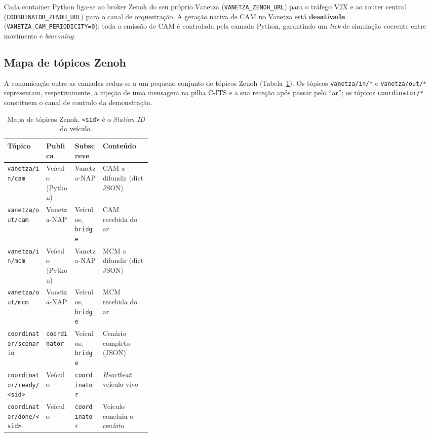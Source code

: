 \documentclass[11pt,a4paper]{article}
\begin{document}
Cada container Python liga-se ao broker Zenoh do seu próprio Vanetza
(\texttt{VANETZA\_ZENOH\_URL}) para o tráfego V2X e ao router central
(\texttt{COORDINATOR\_ZENOH\_URL}) para o canal de orquestração. A geração nativa de
CAM no Vanetza está \textbf{desativada} (\texttt{VANETZA\_CAM\_PERIODICITY=0}): toda a
emissão de CAM é controlada pela camada Python, garantindo um \emph{tick} de simulação
coerente entre movimento e \emph{beaconing}.

\subsection{Mapa de tópicos Zenoh}

A comunicação entre as camadas reduz-se a um pequeno conjunto de tópicos Zenoh
(Tabela~\ref{tab:topicos}). Os tópicos \texttt{vanetza/in/*} e \texttt{vanetza/out/*}
representam, respetivamente, a injeção de uma mensagem na pilha C-ITS e a sua receção
após passar pelo ``ar''; os tópicos \texttt{coordinator/*} constituem o canal de
controlo da demonstração.

\begin{table}[H]
  \centering
  \small
  \renewcommand{\arraystretch}{1.2}
  \begin{tabular}{@{}lllp{0.34\linewidth}@{}}
    \toprule
    \textbf{Tópico} & \textbf{Publica} & \textbf{Subscreve} & \textbf{Conteúdo} \\
    \midrule
    \texttt{vanetza/in/cam}  & Veículo (Python) & Vanetza-NAP & CAM a difundir (dict JSON) \\
    \texttt{vanetza/out/cam} & Vanetza-NAP & Veículos, \texttt{bridge} & CAM recebida do ar \\
    \texttt{vanetza/in/mcm}  & Veículo (Python) & Vanetza-NAP & MCM a difundir (dict JSON) \\
    \texttt{vanetza/out/mcm} & Vanetza-NAP & Veículos, \texttt{bridge} & MCM recebida do ar \\
    \midrule
    \texttt{coordinator/scenario}      & \texttt{coordinator} & Veículos, \texttt{bridge} & Cenário completo (JSON) \\
    \texttt{coordinator/ready/<sid>}   & Veículo & \texttt{coordinator} & \emph{Heartbeat}: veículo vivo \\
    \texttt{coordinator/done/<sid>}    & Veículo & \texttt{coordinator} & Veículo concluiu o cenário \\
    \bottomrule
  \end{tabular}
  \caption{Mapa de tópicos Zenoh. \texttt{<sid>} é o \emph{Station ID} do veículo.}
  \label{tab:topicos}
\end{table}
\end{document}
